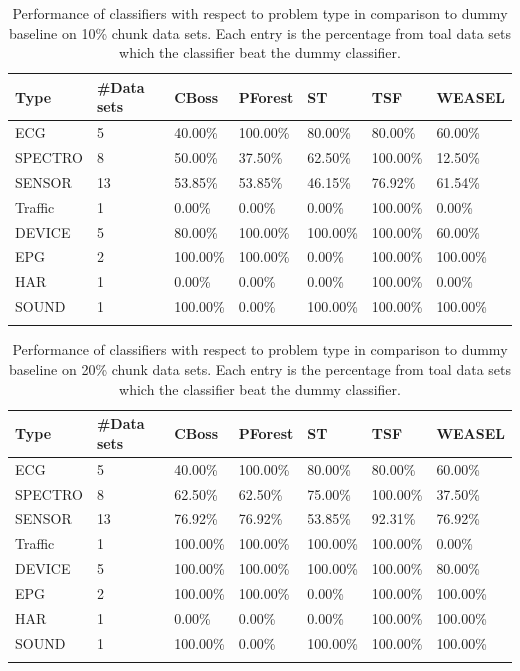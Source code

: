         
\begin{table}[!htb]
	\setlength\extrarowheight{2pt} %
	\begin{tabularx}{\textwidth}{|X|X|X|X|X|X|X|}
	\hline
	\textbf{Type} & \textbf{\#Data sets} & \textbf{CBoss} & \textbf{PForest} & \textbf{ST} & \textbf{TSF} & \textbf{WEASEL} \\ \hline
		ECG & 5 & 40.00\% & 100.00\% & 80.00\% & 80.00\% & 60.00\% \\ \hline
		SPECTRO & 8 &50.00\% & 37.50\% & 62.50\% & 100.00\% & 12.50\% \\ \hline
		SENSOR & 13 & 53.85\% & 53.85\% & 46.15\% & 76.92\% & 61.54\% \\ \hline
		Traffic & 1 & 0.00\% & 0.00\% & 0.00\% & 100.00\% & 0.00\% \\ \hline
		DEVICE & 5 & 80.00\% & 100.00\% & 100.00\% & 100.00\% & 60.00\% \\ \hline
		EPG & 2 & 100.00\% & 100.00\% & 0.00\% & 100.00\% & 100.00\% \\ \hline
		HAR & 1 & 0.00\% & 0.00\% & 0.00\% & 100.00\% & 0.00\% \\ \hline
		SOUND & 1 & 100.00\% & 0.00\% & 100.00\% & 100.00\% & 100.00\% \\ \hline
  \caption{Performance of classifiers with respect to problem type in comparison to dummy baseline on 10\% chunk data sets. Each entry is the percentage from toal data sets which the classifier beat the dummy classifier.}
  \end{tabularx}
\end{table}

\begin{table}[!htb]
	\setlength\extrarowheight{2pt} %
	\begin{tabularx}{\textwidth}{|X|X|X|X|X|X|X|}
	\hline
	\textbf{Type} & \textbf{\#Data sets} & \textbf{CBoss} & \textbf{PForest} & \textbf{ST} & \textbf{TSF} & \textbf{WEASEL} \\ \hline
		ECG & 5 & 40.00\% & 100.00\% & 80.00\% & 80.00\% & 60.00\% \\ \hline
		SPECTRO & 8 &62.50\% & 62.50\% & 75.00\% & 100.00\% & 37.50\% \\ \hline
		SENSOR & 13 & 76.92\% & 76.92\% & 53.85\% & 92.31\% & 76.92\% \\ \hline
		Traffic & 1 & 100.00\% & 100.00\% & 100.00\% & 100.00\% & 0.00\% \\ \hline
		DEVICE & 5 & 100.00\% & 100.00\% & 100.00\% & 100.00\% & 80.00\% \\ \hline
		EPG & 2 & 100.00\% & 100.00\% & 0.00\% & 100.00\% & 100.00\% \\ \hline
		HAR & 1 & 0.00\% & 0.00\% & 0.00\% & 100.00\% & 100.00\% \\ \hline
		SOUND & 1 & 100.00\% & 0.00\% & 100.00\% & 100.00\% & 100.00\% \\ \hline
  \caption{Performance of classifiers with respect to problem type in comparison to dummy baseline on 20\% chunk data sets. Each entry is the percentage from toal data sets which the classifier beat the dummy classifier.}
  \end{tabularx}
\end{table}

